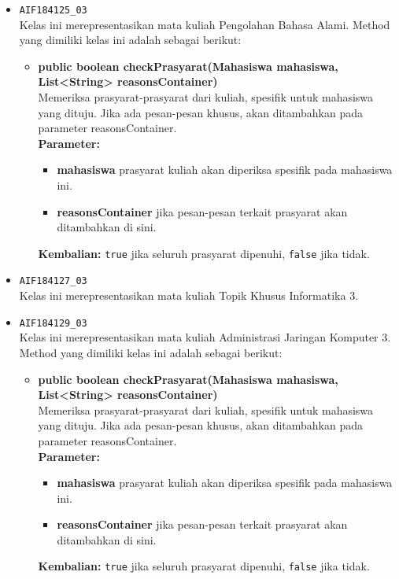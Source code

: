 \begin{enumerate}
\begin{itemize}
\begin{itemize}
		\end{itemize}
		\item \texttt{AIF184125\_03} \\
		Kelas ini merepresentasikan mata kuliah Pengolahan Bahasa Alami. Method yang dimiliki kelas ini adalah sebagai berikut: 
		\begin{itemize}
			\item \textbf{public boolean checkPrasyarat(Mahasiswa mahasiswa, List<String> reasonsContainer)}\\
			Memeriksa prasyarat-prasyarat dari kuliah, spesifik untuk mahasiswa yang dituju. Jika ada pesan-pesan khusus, akan ditambahkan pada parameter reasonsContainer.\\
			\textbf{Parameter:}
			\begin{itemize}
				\item \textbf{mahasiswa} prasyarat kuliah akan diperiksa spesifik pada mahasiswa ini.
				\item \textbf{reasonsContainer} jika pesan-pesan terkait prasyarat akan ditambahkan di sini.
			\end{itemize}
			\textbf{Kembalian:} \texttt{true} jika seluruh prasyarat dipenuhi, \texttt{false} jika tidak.
		\end{itemize}
		\item \texttt{AIF184127\_03} \\
		Kelas ini merepresentasikan mata kuliah Topik Khusus Informatika 3.
		\item \texttt{AIF184129\_03} \\
		Kelas ini merepresentasikan mata kuliah Administrasi Jaringan Komputer 3. Method yang dimiliki kelas ini adalah sebagai berikut: 
		\begin{itemize}
			\item \textbf{public boolean checkPrasyarat(Mahasiswa mahasiswa, List<String> reasonsContainer)}\\
			Memeriksa prasyarat-prasyarat dari kuliah, spesifik untuk mahasiswa yang dituju. Jika ada pesan-pesan khusus, akan ditambahkan pada parameter reasonsContainer.\\
			\textbf{Parameter:}
			\begin{itemize}
				\item \textbf{mahasiswa} prasyarat kuliah akan diperiksa spesifik pada mahasiswa ini.
				\item \textbf{reasonsContainer} jika pesan-pesan terkait prasyarat akan ditambahkan di sini.
			\end{itemize}
			\textbf{Kembalian:} \texttt{true} jika seluruh prasyarat dipenuhi, \texttt{false} jika tidak.

\end{itemize}
\end{itemize}
\end{enumerate}
